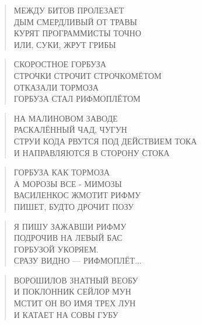 \poemtitle{***}
\begin{verse}
МЕЖДУ БИТОВ ПРОЛЕЗАЕТ\\
ДЫМ СМЕРДЛИВЫЙ ОТ ТРАВЫ\\
КУРЯТ ПРОГРАММИСТЫ ТОЧНО\\
ИЛИ, СУКИ, ЖРУТ ГРИБЫ
\end{verse}

\poemtitle{***}
\begin{verse}
СКОРОСТНОЕ ГОРБУЗА\\
СТРОЧКИ СТРОЧИТ СТРОЧКОМЁТОМ\\
ОТКАЗАЛИ ТОРМОЗА\\
ГОРБУЗА СТАЛ РИФМОПЛЁТОМ
\end{verse}

\poemtitle{***}
\begin{verse}
НА МАЛИНОВОМ ЗАВОДЕ\\
РАСКАЛЁННЫЙ ЧАД, ЧУГУН\\
СТРУИ КОДА РВУТСЯ ПОД ДЕЙСТВИЕМ ТОКА\\
И НАПРАВЛЯЮТСЯ В СТОРОНУ СТОКА
\end{verse}

\poemtitle{***}
\begin{verse}
ГОРБУЗА КАК ТОРМОЗА\\
А МОРОЗЫ ВСЕ - МИМОЗЫ\\
ВАСИЛЕНКОС ЖМОТИТ РИФМУ\\
ПИШЕТ, БУДТО ДРОЧИТ ПОЗУ
\end{verse}

\poemtitle{***}
\begin{verse}
Я ПИШУ ЗАЖАВШИ РИФМУ\\
ПОДРОЧИВ НА ЛЕВЫЙ БАС\\
ГОРБУЗОЙ УКОРЯЕМ.\\
СРАЗУ ВИДНО — РИФМОПЛЁТ...
\end{verse}

\poemtitle{***}
\begin{verse}
ВОРОШИЛОВ ЗНАТНЫЙ ВЕОБУ\\
И ПОКЛОННИК СЕЙЛОР МУН\\
МСТИТ ОН ВО ИМЯ ТРЕХ ЛУН\\
И КАТАЕТ НА СОВЫ ГУБУ
\end{verse}

